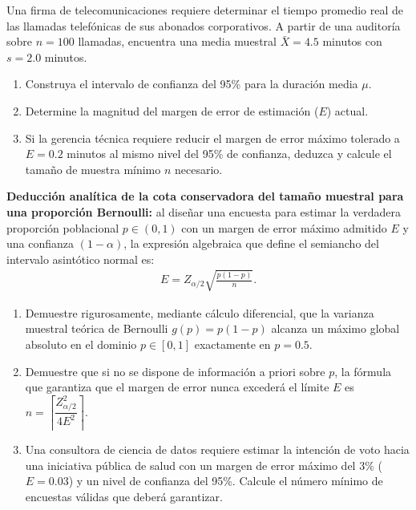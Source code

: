 \begin{problema}
	\label{prob:6af5954}
	Una firma de telecomunicaciones requiere determinar el tiempo promedio real de las llamadas telefónicas de sus abonados corporativos. A partir de una auditoría sobre $n = 100$ llamadas, encuentra una media muestral $\bar{X} = 4.5$ minutos con $s = 2.0$ minutos.
	\begin{enumerate}
		\item Construya el intervalo de confianza del 95\% para la duración media $\mu$.
		\item Determine la magnitud del margen de error de estimación ($E$) actual.
		\item Si la gerencia técnica requiere reducir el margen de error máximo tolerado a $E = 0.2$ minutos al mismo nivel del 95\% de confianza, deduzca y calcule el tamaño de muestra mínimo $n$ necesario.
	\end{enumerate}
\end{problema}

\begin{problema}
	\label{prob:0257f5f}
	\textbf{Deducción analítica de la cota conservadora del tamaño muestral para una proporción Bernoulli:} al diseñar una encuesta para estimar la verdadera proporción poblacional $p \in (0,1)$ con un margen de error máximo admitido $E$ y una confianza $(1-\alpha)$, la expresión algebraica que define el semiancho del intervalo asintótico normal es:
	\begin{align}
		E = Z_{\alpha/2} \sqrt{\frac{p(1-p)}{n}}.
	\end{align}
	\begin{enumerate}
		\item Demuestre rigurosamente, mediante cálculo diferencial, que la varianza muestral teórica de Bernoulli $g(p) = p(1-p)$ alcanza un máximo global absoluto en el dominio $p \in [0,1]$ exactamente en $p = 0.5$.
		\item Demuestre que si no se dispone de información a priori sobre $p$, la fórmula que garantiza que el margen de error nunca excederá el límite $E$ es $n = \left\lceil \dfrac{Z_{\alpha/2}^2}{4 E^2} \right\rceil$.
		\item Una consultora de ciencia de datos requiere estimar la intención de voto hacia una iniciativa pública de salud con un margen de error máximo del $3\%$ ($E = 0.03$) y un nivel de confianza del 95\%. Calcule el número mínimo de encuestas válidas que deberá garantizar.
	\end{enumerate}
\end{problema}


